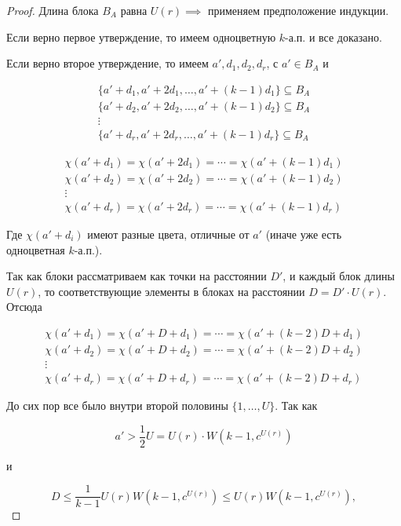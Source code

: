 \begin{normalsize}
\begin{proof}
    Длина блока $B_A$ равна $U(r) \implies$ применяем предположение индукции.
    
    Если верно первое утверждение, то имеем одноцветную $k$-а.п. и все доказано.

    Если верно второе утверждение, то имеем $a', d_1, d_2, d_r$, с $a' \in B_A$ и 

    \begin{gather*}
        \{ a' + d_1, a' + 2d_1, \ldots, a' + (k - 1)d_1 \} \subseteq B_A \\
        \{ a' + d_2, a' + 2d_2, \ldots, a' + (k - 1)d_2 \} \subseteq B_A \\
        \vdots \\
        \{ a' + d_r, a' + 2d_r, \ldots, a' + (k - 1)d_r \} \subseteq B_A
    \end{gather*}

    \begin{gather*}
        \chi(a' + d_1) = \chi(a' + 2d_1) = \cdots = \chi(a' + (k - 1)d_1) \\
        \chi(a' + d_2) = \chi(a' + 2d_2) = \cdots = \chi(a' + (k - 1)d_2) \\
        \vdots \\
        \chi(a' + d_r) = \chi(a' + 2d_r) = \cdots = \chi(a' + (k - 1)d_r)
    \end{gather*}

    Где $\chi(a' + d_i)$ имеют разные цвета, отличные от $a'$ (иначе уже есть одноцветная $k$-а.п.).

    Так как блоки рассматриваем как точки на расстоянии $D'$, и каждый блок длины $U(r)$, то соответствующие элементы в блоках на расстоянии $D = D' \cdot U(r)$. Отсюда 

    \begin{gather*}
        \chi(a' + d_1) = \chi(a' + D + d_1) = \cdots = \chi(a' + (k - 2)D + d_1) \\
        \chi(a' + d_2) = \chi(a' + D + d_2) = \cdots = \chi(a' + (k - 2)D + d_2) \\
        \vdots \\
        \chi(a' + d_r) = \chi(a' + D + d_r) = \cdots = \chi(a' + (k - 2)D + d_r)
    \end{gather*}

    До сих пор все было внутри второй половины $\{1, \ldots, U\}$. Так как 

    \[ a' > \frac{1}{2}U = U(r) \cdot W(k - 1, c^{U(r)}) \]

    и

    \[ D \leq \frac{1}{k - 1} U(r) W(k - 1, c^{U(r)}) \leq U(r) W(k - 1, c^{U(r)}), \]


\end{proof}
\end{normalsize}
